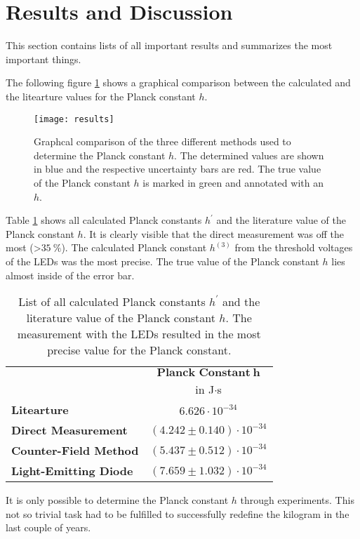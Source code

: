 \section{Results and Discussion}
\label{sec:Results_and_Discussion}
This section contains lists of all important results and summarizes the most important things.

The following figure \ref{fig:results} shows a graphical comparison between the calculated and the litearture values for the Planck constant $h$.

\begin{figure}[H]
	\centering
	\texttt{[image: results]}
	\caption{Graphcal comparison of the three different methods used to determine the Planck constant $h$. The determined values are shown in blue and the respective uncertainty bars are red. The true value of the Planck constant $h$ is marked in green and annotated with an $h$.}
	\label{fig:results}
\end{figure}

Table \ref{tab:Planck_Constants} shows all calculated Planck constants $h^\prime$ and the literature value of the Planck constant $h$. It is clearly visible that the direct measurement was off the most (>$35\ \%$). The calculated Planck constant $h^{(3)}$ from the threshold voltages of the LEDs was the most precise. The true value of the Planck constant $h$ lies almost inside of the error bar.

\begin{table}[H]
	\centering
	\renewcommand{\arraystretch}{1.2}
	\begin{tabular}{|l|c|}
		\cline{2-2}
		\multicolumn{1}{c|}{} & $\textbf{Planck Constant}\ \boldsymbol{h}$ \\
		\multicolumn{1}{c|}{} & in J$\cdot$s \\
		\hline
		\textbf{Litearture \cite{planck_constant}} & $6.626\cdot10^{-34}$ \\
		\hline\hline
		\textbf{Direct Measurement} & $(4.242\pm 0.140)\cdot10^{-34}$ \\ %
		\hline
		\textbf{Counter-Field Method} & $(5.437\pm 0.512)\cdot10^{-34}$ \\ %
		\hline
		\textbf{Light-Emitting Diode} & $(7.659\pm 1.032)\cdot10^{-34}$ \\ %
		\hline
	\end{tabular}
	\caption{List of all calculated Planck constants $h^\prime$ and the literature value of the Planck constant $h$. The measurement with the LEDs resulted in the most precise value for the Planck constant.}
	\label{tab:Planck_Constants}
\end{table}

It is only possible to determine the Planck constant $h$ through experiments. This not so trivial task had to be fulfilled to successfully redefine the kilogram in the last couple of years.
